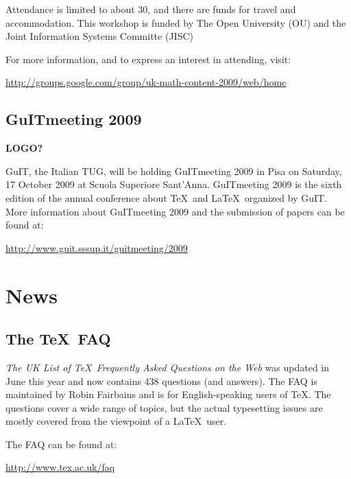 \documentclass[a4paper,twoside,twocolumn]{article}
\begin{document}
Attendance is limited to about 30, and there are funds for travel and accommodation. This workshop is funded by The Open University (OU) and the Joint Information Systems Committe (JISC)

For more information, and to express an interest in attending, visit:
\begin{center}
 \href{http://groups.google.com/group/uk-math-content-2009/web/home}
       {http://groups.google.com/group/uk-math-content-2009/web/home}
\end{center}
      
\subsection{GuITmeeting 2009}

\textbf{LOGO?}

GuIT, the Italian TUG, will be holding GuITmeeting 2009 in Pisa on Saturday, 17 October 2009 at Scuola Superiore Sant'Anna. GuITmeeting 2009 is the sixth edition of the annual conference about \TeX\ and \LaTeX\ organized by GuIT.
More information about GuITmeeting 2009 and the submission of papers can be found at:
\begin{center}
 \href{http://www.guit.sssup.it/guitmeeting/2009/2009.en.php}{http://www.guit.sssup.it/guitmeeting/2009}
\end{center}

\section{News}
\subsection{The \TeX\ FAQ}
\emph{The UK List of \TeX\ Frequently Asked Questions on the Web} was updated in June this year and now contains 438 questions (and answers). The FAQ is maintained by Robin Fairbains and is for English-speaking users of \TeX. The questions cover a wide range of topics, but the actual typesetting issues are mostly covered from the viewpoint of a \LaTeX\ user. 

The FAQ can be found at:
\begin{center}
\href{http://www.tex.ac.uk/faq}{http://www.tex.ac.uk/faq}
\end{center}
\end{document}
